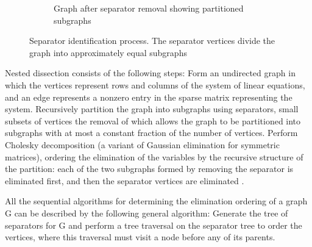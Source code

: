 \begin{figure}[htbp]
\begin{subfigure}[b]{0.45\textwidth}
        \caption{Graph after separator removal showing partitioned subgraphs}
        \label{fig:nd-separated}
    \end{subfigure}
    \caption{Separator identification process. The separator vertices divide the graph into approximately equal subgraphs}
    \label{fig:nested-dissection}
\end{figure}

Nested dissection consists of the following steps: Form an undirected graph in which the vertices represent rows and columns of the system of linear equations, and an edge represents a nonzero entry in the sparse matrix representing the system. Recursively partition the graph into subgraphs using separators, small subsets of vertices the removal of which allows the graph to be partitioned into subgraphs with at most a constant fraction of the number of vertices. Perform Cholesky decomposition (a variant of Gaussian elimination for symmetric matrices), ordering the elimination of the variables by the recursive structure of the partition: each of the two subgraphs formed by removing the separator is eliminated first, and then the separator vertices are eliminated \cite{george_nested_1973}. 

All the sequential algorithms for determining the elimination ordering of a graph G can be described by the following general algorithm: Generate the tree of separators for G and perform a tree traversal on the separator tree to order the vertices, where this traversal must visit a node before any of its parents.


